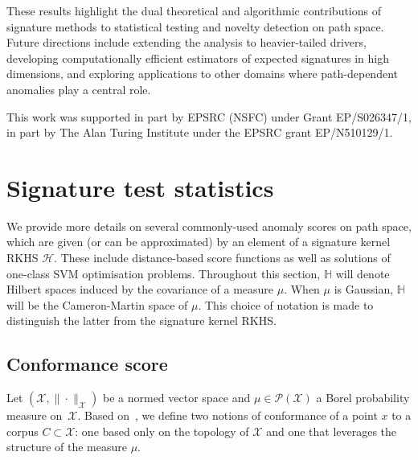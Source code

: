 \documentclass[twoside,11pt]{article}
\numberwithin{equation}{section}
\numberwithin{theorem}{section}
\newcommand{\X}{\mathcal{X}}
\newcommand{\h}{\mathcal{H}}
\newcommand{\Hh}{\mathbb{H}}
\begin{document}
These results highlight the dual theoretical and algorithmic contributions of signature methods to statistical testing and novelty detection on path space. Future directions include extending the analysis to heavier-tailed drivers, developing computationally efficient estimators of expected signatures in high dimensions, and exploring applications to other domains where path-dependent anomalies play a central role.

This work was supported in part by EPSRC (NSFC) under Grant EP/S026347/1, in part by The Alan Turing Institute under the EPSRC grant EP/N510129/1.

\newpage 
\appendix 

\section{Signature test statistics}\label{sec:test_statistcs}

We provide more details on several commonly-used anomaly scores on path space, which are given (or can be approximated) by an element of a signature kernel RKHS $\h$. These include distance-based score functions as well as solutions of one-class SVM optimisation problems. Throughout this section, $\Hh$ will denote Hilbert spaces induced by the covariance of a measure $\mu.$ When $\mu$ is Gaussian, $\Hh$ will be the Cameron-Martin space of $\mu.$ This choice of notation is made to distinguish the latter from the signature kernel RKHS.


\subsection{Conformance score}\label{ssec:conformance_score}

Let $(\X, \|\cdot\|_{\X})$ be a normed vector space and $\mu\in\mathscr{P}(\X)$ a Borel probability measure on~$\X$.
 Based on~\cite{cochrane2020anomaly}, we define two notions of conformance of a point $x$ to a corpus $C\subset\X$:
 one based only on the topology of $\X$ and one that leverages the structure of the measure $\mu$.
 
\end{document}
